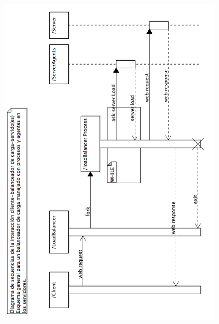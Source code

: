       \newpage
       \begin{figure}[h]
        \centering
        \includegraphics[scale=0.5]{diagramas/SequenceDiagramAgents2.png}
      \end{figure}